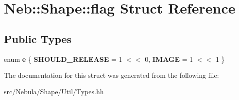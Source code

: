 \hypertarget{structNeb_1_1Shape_1_1flag}{\section{\-Neb\-:\-:\-Shape\-:\-:flag \-Struct \-Reference}
\label{structNeb_1_1Shape_1_1flag}
}
\subsection*{\-Public \-Types}
\begin{DoxyCompactItemize}
\item 
enum {\bfseries e} \{ {\bfseries \-S\-H\-O\-U\-L\-D\-\_\-\-R\-E\-L\-E\-A\-S\-E} =  1 $<$$<$ 0, 
{\bfseries \-I\-M\-A\-G\-E} =  1 $<$$<$ 1
 \}
\end{DoxyCompactItemize}


\-The documentation for this struct was generated from the following file\-:\begin{DoxyCompactItemize}
\item 
src/\-Nebula/\-Shape/\-Util/\-Types.\-hh\end{DoxyCompactItemize}
